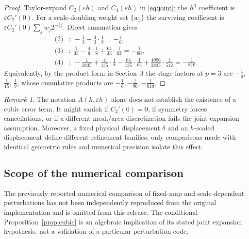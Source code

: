 \documentclass[11pt]{article}
\theoremstyle{remark}
\newtheorem{remark}{Remark}
\begin{document}
\begin{proof}
Taylor-expand $C_2(\varepsilon h)$ and $C_4(\varepsilon h)$ in \eqref{eq:joint}; the $h^3$
coefficient is $\varepsilon C_2'(0)$. For a scale-doubling weight set $\{w_j\}$ the surviving
coefficient is $\varepsilon C_2'(0)\sum_jw_j2^{-3j}$. Direct summation gives
\begin{align*}
\text{(2)}&:\ -\tfrac13+\tfrac43\cdot\tfrac18=-\tfrac16,\\
\text{(3)}&:\ \tfrac1{45}-\tfrac49\cdot\tfrac18+\tfrac{64}{45}\cdot\tfrac1{64}=-\tfrac1{90},\\
\text{(4)}&:\ -\tfrac1{2835}+\tfrac4{135}\cdot\tfrac18-\tfrac{64}{135}\cdot\tfrac1{64}
+\tfrac{4096}{2835}\cdot\tfrac1{512}=-\tfrac1{810}.
\end{align*}
Equivalently, by the product form in Section~3 the stage factors at $p=3$ are $-\tfrac16$, $\tfrac1{15}$,
$\tfrac19$, whose cumulative products are $-\tfrac16,-\tfrac1{90},-\tfrac1{810}$.
\end{proof}

\begin{remark}
The notation $A(h,\varepsilon h)$ alone does not establish the existence of a cubic error
term. It might vanish if $C_2'(0)=0$, if symmetry forces cancellations, or if a different
mesh/area discretization fails the joint expansion assumption. Moreover, a fixed physical
displacement $\delta$ and an $h$-scaled displacement define different refinement families; only
comparisons made with identical geometric rules and numerical precision isolate this effect.
\end{remark}

\subsection{Scope of the numerical comparison}
The previously reported numerical comparison of fixed-map and scale-dependent
perturbations has not been independently reproduced from the original
implementation and is omitted from this release. The conditional
Proposition~\ref{prop:cubic} is an algebraic implication of its stated joint
expansion hypothesis, not a validation of a particular perturbation code.
\end{document}

